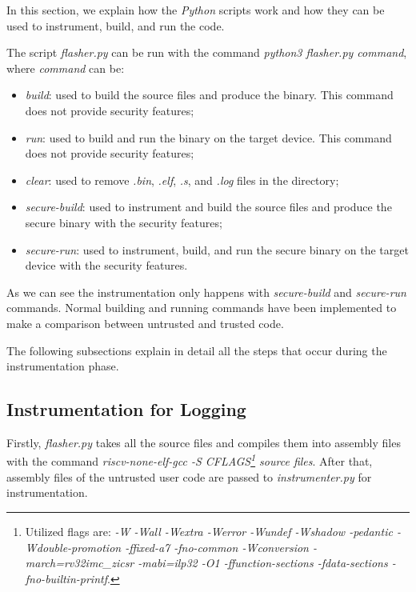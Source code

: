 In this section, we explain how the \textit{Python} scripts work and how they can
be used to instrument, build, and run the code.

The script \textit{flasher.py} can be run with the command \textit{python3
flasher.py command}, where \textit{command} can be:
\begin{itemize}[noitemsep]
  \item \textit{build}: used to build the source files and produce the binary.
    This command does not provide security features;

  \item \textit{run}: used to build and run the binary on the target device.
    This command does not provide security features;

  \item \textit{clear}: used to remove \textit{.bin}, \textit{.elf}, \textit{.s},
    and \textit{.log} files in the directory;

  \item \textit{secure-build}: used to instrument and build the source files and
    produce the secure binary with the security features;

  \item \textit{secure-run}: used to instrument, build, and run the secure binary
    on the target device with the security features.
\end{itemize}

As we can see the instrumentation only happens with \textit{secure-build} and
\textit{secure-run} commands. Normal building and running commands have been
implemented to make a comparison between untrusted and trusted code.

The following subsections explain in detail all the steps that occur during the
instrumentation phase.

\subsection{Instrumentation for Logging}
\label{subsec:logging}

Firstly, \textit{flasher.py} takes all the source files and compiles them into assembly
files with the command \textit{riscv-none-elf-gcc -S CFLAGS\footnote{Utilized
flags are: \textit{-W -Wall -Wextra -Werror -Wundef -Wshadow -pedantic -Wdouble-promotion
-ffixed-a7 -fno-common -Wconversion -march=rv32imc\_zicsr -mabi=ilp32 -O1 -ffunction-sections
-fdata-sections -fno-builtin-printf}.} source files}. After that, assembly files
of the untrusted user code are passed to \textit{instrumenter.py} for instrumentation.

